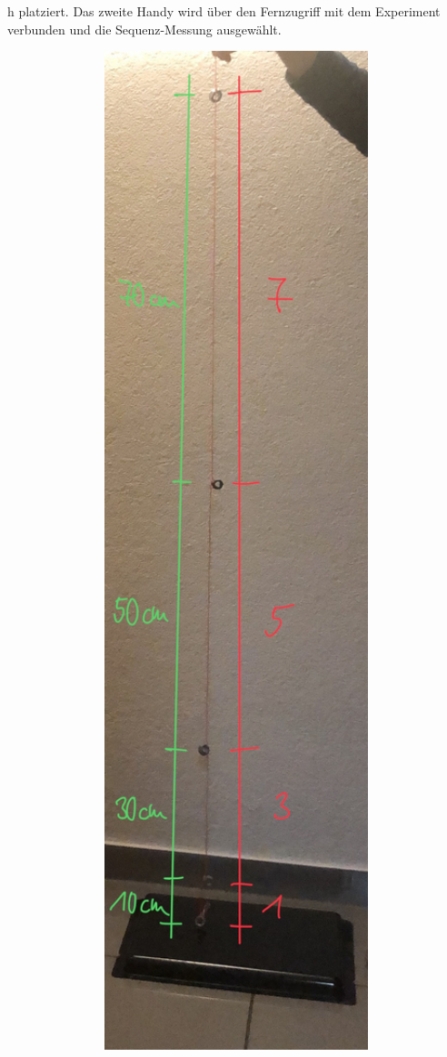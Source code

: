 \documentclass[../main.tex]{subfiles}
\begin{document}
\begin{tcolorbox}
\begin{minipage}[]{0.75\textwidth}
h platziert. Das zweite Handy wird über den Fernzugriff mit dem Experiment verbunden und die \glqq Sequenz\grqq{}-Messung ausgewählt.
    \end{minipage}
    \hspace{0.3cm}
    \begin{minipage}[]{0.2\textwidth}
        \includegraphics[width=1\textwidth]{img/versuchsaufbau}
    \end{minipage}


\end{tcolorbox}
\end{document}
